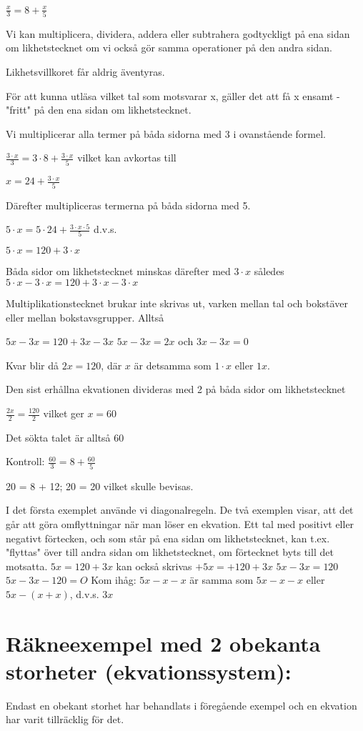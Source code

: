 $\frac{x}{3}=8 + \frac{x}{5}$

Vi kan multiplicera, dividera, addera eller subtrahera godtyckligt på ena sidan
om likhetstecknet om vi också gör samma operationer på den andra sidan.

Likhetsvillkoret får aldrig äventyras.

För att kunna utläsa vilket tal som motsvarar x, gäller det att få x ensamt - "fritt" på den ena sidan om likhetstecknet.

Vi multiplicerar alla termer på båda sidorna med 3 i ovanstående formel.

$\frac{3 \cdot x}{3} = 3 \cdot 8 + \frac{3 \cdot x}{5}$ vilket kan avkortas till

$x = 24 + \frac{3 \cdot x}{5}$

Därefter multipliceras termerna på båda sidorna med 5.

$5 \cdot  x = 5 \cdot 24 + \frac{3 \cdot x \cdot 5}{5}$ d.v.s.

$5 \cdot x = 120 + 3 \cdot x$

Båda sidor om likhetstecknet minskas därefter med $3 \cdot x$
således $5 \cdot x - 3 \cdot x = 120 + 3 \cdot x - 3 \cdot x$

Multiplikationstecknet brukar inte skrivas ut, varken mellan tal och bokstäver
eller mellan bokstavsgrupper. Alltså

$5x - 3x = 120 + 3x - 3x$
$5x - 3x = 2x$ och $3x - 3x = 0$

Kvar blir då $2x = 120$,
där $x$ är detsamma som $1 \cdot x$ eller $1x$.

Den sist erhållna ekvationen divideras med 2 på båda sidor om likhetstecknet

$\frac{2x}{2} = \frac{120}{2}$ vilket ger $x = 60$

Det sökta talet är alltså 60

Kontroll: $\frac{60}{3} = 8 + \frac{60}{5}$

20 = 8 + 12; 20 = 20 vilket skulle bevisas.

I det första exemplet använde vi diagonalregeln. De två exemplen visar, att det
går att göra omflyttningar när man löser en ekvation. Ett tal med positivt eller
negativt förtecken, och som står på ena sidan om likhetstecknet, kan t.ex.
"flyttas" över till andra sidan om likhetstecknet, om förtecknet byts till det
motsatta.
$5x = 120 + 3x$ kan också skrivas
$+5x= +120+ 3x$
$5x-3x= 120$
$5x- 3x-120 =O$
Kom ihåg: $5x-x-x$ är samma som
$5x-x-x$ eller $5x-(x+x)$, d.v.s. $3x$

\section{Räkneexempel med 2 obekanta storheter
(ekvationssystem):}
Endast en obekant storhet har behandlats i föregående exempel och en ekvation
har varit tillräcklig för det.

